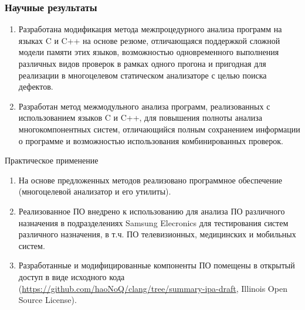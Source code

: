 \documentclass[10pt,gray]{beamer}
\begin{document}


\begin{frame}
\frametitle{Научные результаты}

\begin{enumerate}
  \item Разработана модификация метода межпроцедурного анализа программ на языках C и C++ на основе резюме, отличающаяся поддержкой сложной модели памяти этих языков, возможностью одновременного выполнения различных видов проверок в рамках одного прогона и пригодная для реализации в многоцелевом статическом анализаторе с целью поиска дефектов.
  \item Разработан метод межмодульного анализа программ, реализованных с использованием языков C и C++, для повышения полноты анализа многокомпонентных систем, отличающийся полным сохранением информации о программе и возможностью использования комбинированных проверок.
\end{enumerate}
\end{frame}

\begin{frame}
{\Large Практическое применение}
\begin{enumerate}
  \item На основе предложенных методов реализовано программное обеспечение (многоцелевой анализатор и его утилиты).
  \item Реализованное ПО внедрено к использованию для анализа ПО различного назначения в подразделениях Samsung Elecronics для тестирования систем различного назначения, в т.ч. ПО телевизионных, медицинских и мобильных систем.
  \item Разработанные и модифицированные компоненты ПО помещены в открытый доступ в виде исходного кода (\url{https://github.com/haoNoQ/clang/tree/summary-ipa-draft}, Illinois Open Source License).
\end{enumerate}

\end{frame}
\end{document}
